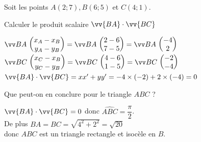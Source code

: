 \documentclass[12pt,a4paper]{article}  %
\begin{document}

%
%

\vspace{-0.3cm}
Soit les points $A(2 ; 7), B(6 ; 5)$ et $C(4 ; 1)$.
\begin{enumMet}
	\item {} Calculer le produit scalaire $\vv{B A} \cdot \vv{B C}$\quad {}\\
	\begin{corrBox}
		$\Coord{BA}{x_A-x_B}{y_A-y_B}=\Coord{BA}{2-6}{7-5}=\Coord{BA}{-4}{2}$\\
		$\Coord{BC}{x_C-x_B}{y_C-y_B}=\Coord{BC}{4-6}{1-5}=\Coord{BC}{-2}{-4}$\\
		$\vv{B A} \cdot \vv{B C}=x x^{\prime}+y y^{\prime}=-4 \times(-2)+2 \times(-4)=0$
	\end{corrBox}
	\item {} Que peut-on en conclure pour le triangle $A B C$ ?\quad {}\\
	\begin{corrBox}
		$\vv{B A} \cdot \vv{B C}=0$ donc $\widehat{A B C}=\dfrac{\pi}{2}$.\\
		De plus $B A=B C=\sqrt{4^{2}+2^{2}}=\sqrt{20}$\\
		donc $A B C$ est un triangle rectangle et isocèle en $B$.
	\end{corrBox}
\end{enumMet}
\end{document}
